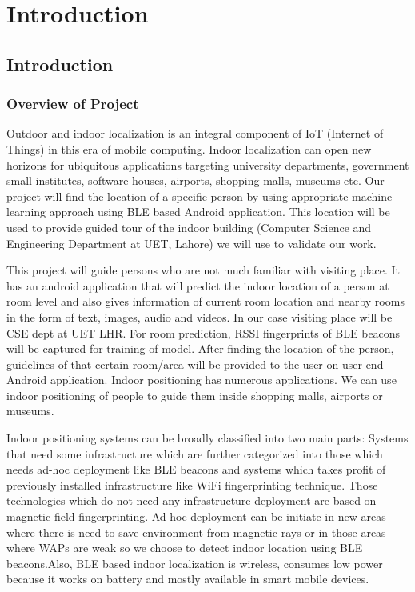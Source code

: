 
\chapter{Introduction} %
\label{Chapter1}

\section{Introduction}
\subsection{Overview of Project}
Outdoor and indoor localization is an integral component of  IoT (Internet of Things) in this era of mobile computing. Indoor localization can open new horizons for ubiquitous applications targeting university departments, government small institutes, software houses, airports, shopping malls, museums etc. Our project will find the location of a specific person by using appropriate machine learning approach using BLE based Android application. This location will be used to provide guided tour of the indoor building (Computer Science and Engineering Department at UET, Lahore) we will use to validate our work. 

This project will guide persons who are not much familiar with visiting place. It has an android application that will predict the indoor location of a person at room level and also gives information of current room location and nearby rooms in the form of text, images, audio and videos. In our case visiting place will be CSE dept at UET LHR. For room prediction, RSSI fingerprints of BLE beacons will be captured for training of model. After finding the location of the person, guidelines of that certain room/area will be provided to the user on user end Android application. Indoor positioning has numerous applications. We can use indoor positioning of people to guide them inside shopping malls, airports or museums. 


Indoor positioning systems can be broadly classified into two main parts: Systems that need some infrastructure which are further categorized into those which needs ad-hoc deployment  like BLE beacons and systems which takes profit of previously installed infrastructure like WiFi fingerprinting technique. Those technologies which do not need any infrastructure deployment are based on magnetic field fingerprinting. Ad-hoc deployment can be initiate in new areas where there is need to save environment from magnetic rays or in those areas where WAPs are weak so we choose to detect indoor location using BLE beacons.Also,  BLE based indoor  localization is wireless, consumes low power because it works on battery and mostly available in smart mobile devices.

